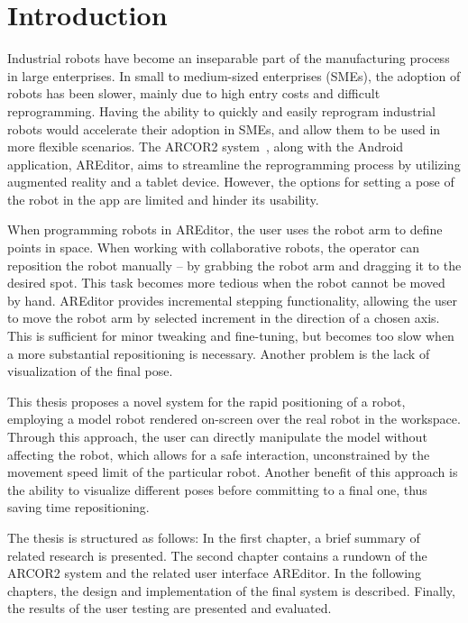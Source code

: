 \chapter{Introduction}

Industrial robots have become an inseparable part of the manufacturing process in large enterprises. In small to medium-sized enterprises (SMEs), the adoption of robots has been slower, mainly due to high entry costs and difficult reprogramming. Having the ability to quickly and easily reprogram industrial robots would accelerate their adoption in SMEs, and allow them to be used in more flexible scenarios. The ARCOR2 system~\cite{kapinus2023arcor2}, along with the Android application, AREditor, aims to streamline the reprogramming process by utilizing augmented reality and a tablet device.  However, the options for setting a pose of the robot in the app are limited and hinder its usability. 

When programming robots in AREditor, the user uses the robot arm to define points in space. When working with collaborative robots, the operator can reposition the robot manually -- by grabbing the robot arm and dragging it to the desired spot. This task becomes more tedious when the robot cannot be moved by hand. AREditor provides incremental stepping functionality, allowing the user to move the robot arm by selected increment in the direction of a chosen axis. This is sufficient for minor tweaking and fine-tuning, but becomes too slow when a more substantial repositioning is necessary. Another problem is the lack of visualization of the final pose. 

This thesis proposes a novel system for the rapid positioning of a robot, employing a model robot rendered on-screen over the real robot in the workspace. Through this approach, the user can directly manipulate the model without affecting the robot, which allows for a safe interaction, unconstrained by the movement speed limit of the particular robot. Another benefit of this approach is the ability to visualize different poses before committing to a final one, thus saving time repositioning. 

The thesis is structured as follows: In the first chapter, a brief summary of related research is presented. The second chapter contains a rundown of the ARCOR2 system and the related user interface AREditor. In the following chapters, the design and implementation of the final system is described. Finally, the results of the user testing are presented and evaluated. 

